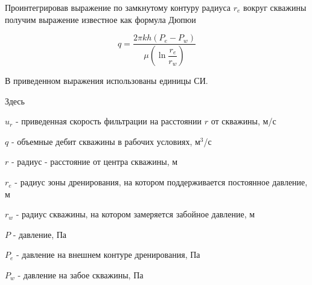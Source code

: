 Проинтегрировав выражение по замкнутому контуру радиуса $r_e$ вокруг скважины получим выражение известное как формула Дюпюи

\begin{equation} \label{eq:dupui_1}
q=\frac{2\pi kh\left(P_e-P_w\right)}{\mu\left(\ln{\dfrac{r_e}{r_w}}\right)}
\end{equation}


В приведенном выражения использованы единицы СИ. 

Здесь 

$u_r$ - приведенная скорость фильтрации на расстоянии $r$ от скважины, м/с 

$q$ - объемные дебит скважины в рабочих условиях, м$^3$/с

$r$ -  радиус - расстояние от центра скважины, м

$r_e$ -  радиус зоны дренирования, на котором поддерживается постоянное давление, м

$r_w$ - радиус скважины, на котором замеряется забойное давление, м

$P$ - давление, Па

$P_e$ - давление на внешнем контуре дренирования, Па

$P_w$ - давление на забое скважины, Па

